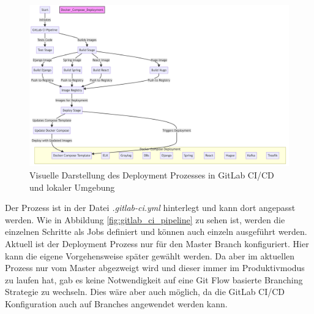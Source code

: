 \begin{figure}[h]
    \centering
    \includegraphics[width=1\textwidth,height=\textheight,keepaspectratio]{includes/figures/docker_deployment.png}
    \caption{Visuelle Darstellung des Deployment Prozesses in GitLab CI/CD und lokaler Umgebung}
    \label{fig:deployment_process}
\end{figure}


Der Prozess ist in der Datei \textit{.gitlab-ci.yml} hinterlegt und kann dort angepasst werden.
Wie in Abbildung \ref{fig:gitlab_ci_pipeline} zu sehen ist, werden die einzelnen Schritte als Jobs definiert und können auch einzeln ausgeführt werden.
Aktuell ist der Deployment Prozess nur für den Master Branch konfiguriert. Hier kann die eigene Vorgehensweise später gewählt werden.
Da aber im aktuellen Prozess nur vom Master abgezweigt wird und dieser immer im Produktivmodus zu laufen hat, gab es keine Notwendigkeit auf eine Git Flow basierte Branching Strategie zu wechseln. 
Dies wäre aber auch möglich, da die GitLab CI/CD Konfiguration auch auf Branches angewendet werden kann.




